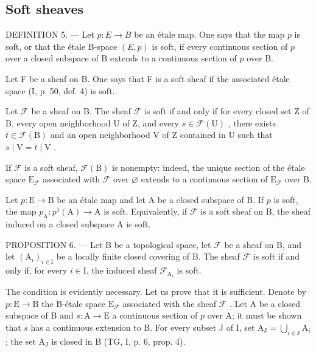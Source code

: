 \subsection{Soft sheaves}

DEFINITION 5. --- Let \(p\colon E \rightarrow B\) be an étale map. One says that the map \(p\) is soft, or that the étale B-space \((E,p)\) is soft, if every continuous section of \(p\) over a closed subspace of B extends to a continuous section of \(p\) over B.

Let F be a sheaf on B. One says that F is a soft sheaf if the associated étale space (I, p. 50, def. 4) is soft.

Let \(\mathcal{F}\) be a sheaf on B. The sheaf \(\mathcal{F}\) is soft if and only if for every closed set Z of B, every open neighborhood U of Z, and every \(s \in \mathcal{F}(\mathrm{U})\) , there exists \(t \in \mathcal{F}(\mathrm{B})\) and an open neighborhood V of Z contained in U such that \(s \mid \mathrm{V} = t \mid \mathrm{V}\) .

If \(\mathcal{F}\) is a soft sheaf, \(\mathcal{F}(\mathrm{B})\) is nonempty: indeed, the unique section of the étale space \(\mathrm{E}_{\mathcal{F}}\) associated with \(\mathcal{F}\) over \(\varnothing\) extends to a continuous section of \(\mathrm{E}_{\mathcal{F}}\) over B.

Let \(p \colon \mathrm{E} \to \mathrm{B}\) be an étale map and let A be a closed subspace of B. If \(p\) is soft, the map \(p_{\mathrm{A}} \colon \overline{p}^{1}(\mathrm{A}) \to \mathrm{A}\) is soft. Equivalently, if \(\mathcal{F}\) is a soft sheaf on B, the sheaf induced on a closed subspace A is soft.

PROPOSITION 6. --- Let B be a topological space, let \(\mathcal{F}\) be a sheaf on B, and let \((\mathrm{A}_i)_{i\in \mathrm{I}}\) be a locally finite closed covering of B. The sheaf \(\mathcal{F}\) is soft if and only if, for every \(i\in \mathrm{I}\), the induced sheaf \(\mathcal{F}_{\mathrm{A}_i}\) is soft.

The condition is evidently necessary. Let us prove that it is sufficient. Denote by \(p\colon \mathrm{E}\to \mathrm{B}\) the B-étale space \(\mathrm{E}_{\mathcal{F}}\) associated with the sheaf \(\mathcal{F}\) . Let A be a closed subspace of B and \(s\colon \mathrm{A}\to \mathrm{E}\) a continuous section of \(p\) over A; it must be shown that \(s\) has a continuous extension to B. For every subset J of I, set \(\mathrm{A_J} = \bigcup_{i\in \mathrm{J}}\mathrm{A}_i\) ; the set \(\mathrm{A_J}\) is closed in B (TG, I, p. 6, prop. 4).

